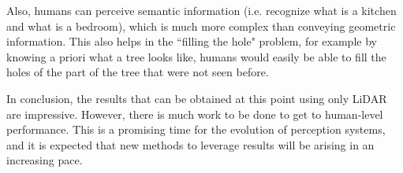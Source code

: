 \documentclass[11pt]{article}
\begin{document}
Also, humans can perceive semantic information (i.e. recognize what is a kitchen and what is a bedroom), which is much more complex than conveying geometric information. This also helps in the ``filling the hole" problem, for example by knowing a priori what a tree looks like, humans would easily be able to fill the holes of the part of the tree that were not seen before.

In conclusion, the results that can be obtained at this point using only LiDAR are impressive. However, there is much work to be done to get to human-level performance. This is a promising time for the evolution of perception systems, and it is expected that new methods to leverage results will be arising in an increasing pace.


	\newpage
	
	
\end{document}
